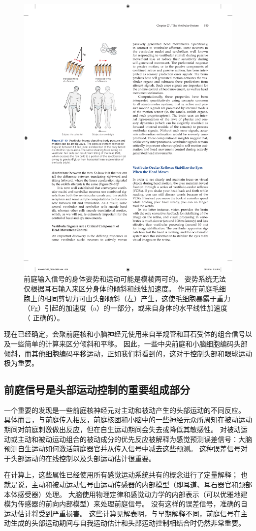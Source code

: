 \begin{figure}[htbp]
	\centering
	\includegraphics[width=0.5\linewidth]{chap27/fig_27_10}
	\caption{前庭输入信号的身体姿势和运动可能是模棱两可的。 姿势系统无法仅根据耳石输入来区分身体的倾斜和线性加速度。 作用在前庭毛细胞上的相同剪切力可由头部倾斜（左）产生，这使毛细胞暴露于重力（Fg）引起的加速度（a）的一部分，或来自身体的水平线性加速度（ 正确的）。}
	\label{fig:27_10}
\end{figure}

现在已经确定，会聚前庭核和小脑神经元使用来自半规管和耳石受体的组合信号以及一些简单的计算来区分倾斜和平移。 因此，一些中央前庭和小脑细胞编码头部倾斜，而其他细胞编码平移运动，正如我们将看到的，这对于控制头部和眼球运动极为重要。

\subsection{前庭信号是头部运动控制的重要组成部分}

一个重要的发现是一些前庭核神经元对主动和被动产生的头部运动的不同反应。 具体而言，与前庭传入相反，前庭核团和小脑中的一些神经元众所周知在被动运动期间对前庭刺激做出反应，但在自生运动期间会失去或降低其敏感性。 对被动运动或主动和被动运动组合的被动成分的优先反应被解释为感觉预测误差信号：大脑预测自生运动如何激活前庭器官并从传入信号中减去这些预测。 这种误差信号对于头部运动的在线控制以及头部运动估计很重要。

在计算上，这些属性已经使用所有感觉运动系统共有的概念进行了定量解释； 也就是说，主动和被动运动信号由运动传感器的内部模型（即耳道、耳石器官和颈部本体感受器）处理。 大脑使用物理定律和感觉动力学的内部表示（可以优雅地建模为传感器的前向内部模型）来处理前庭信号。 没有这样的误差信号，准确的自运动估计将受到严重损害。 这些计算见解表明，与早期解释不同，前庭信号在主动生成的头部运动期间与自我运动估计和头部运动控制相结合时仍然非常重要。

